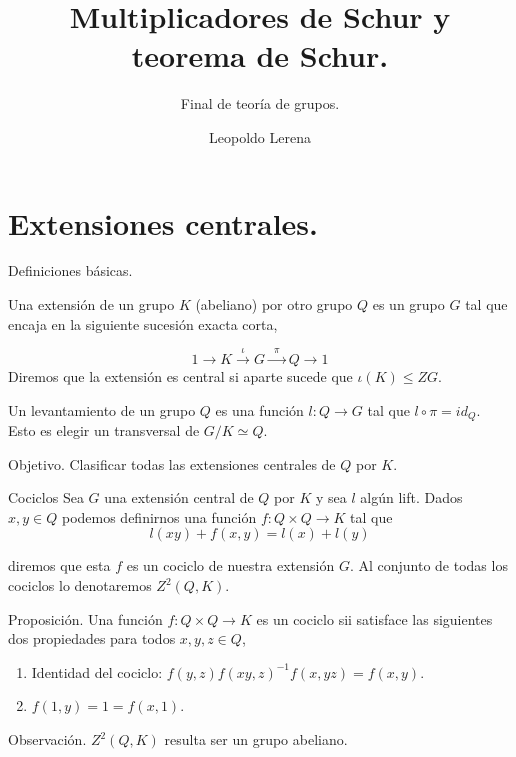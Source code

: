 \documentclass[aspectratio=169, 9pt]{beamer}
\title{Multiplicadores de Schur y teorema de Schur.}
\subtitle{Final de teoría de grupos.}
\date{}
\author{Leopoldo Lerena}
\institute{Universidad de Buenos Aires}
\begin{document}
\maketitle


\section[Extensiones centrales]{Extensiones centrales.}

\begin{frame}[fragile]{Definiciones básicas.}



\bigskip

Una \alert{extensión} de un grupo $K$ (abeliano) por otro grupo $Q$ es un grupo $G$ tal que encaja en la siguiente sucesión exacta corta,

\begin{equation*}
    1\longrightarrow K\xrightarrow{\phantom{a}\iota\phantom{a}}G\xrightarrow{\phantom{a}\pi\phantom{a}}Q\longrightarrow 1
\end{equation*}
\pause
Diremos que la extensión es \alert{central} si aparte sucede que $\iota(K) \le ZG$.

\medskip

Un \alert{levantamiento} de un grupo $Q$ es una función $l:Q \to G$ tal que $l \circ \pi = id_Q$. Esto es elegir un transversal de $G/K \simeq Q$.
\pause
\bigskip
\begin{alertblock}{Objetivo.}
Clasificar todas las extensiones centrales de $Q$ por $K$.
\end{alertblock}
\end{frame}

\begin{frame}[fragile]{Cociclos}
Sea $G$ una extensión central de $Q$ por $K$ y sea $l$ algún lift. Dados $x,y \in Q$ podemos definirnos una función $f:Q \times Q \to K$ tal que 
\begin{equation*}
l(xy) + f(x,y) = l(x) + l(y)    
\end{equation*} 

diremos que esta $f$ es un \alert{cociclo} de nuestra extensión $G$. Al conjunto de todas los cociclos lo denotaremos $Z^2(Q,K)$.
\medskip
\pause
{}
\begin{alertblock}{Proposición.}
	Una función $f:Q \times Q \to K$ es un cociclo sii satisface las siguientes dos propiedades para todos $x,y,z \in Q$,
	\begin{enumerate}
		\item \alert{Identidad del cociclo}: $f(y,z)f(xy,z)^{-1}f(x,yz) = f(x,y)$.
		\item $f(1,y)=1=f(x,1)$. 
	\end{enumerate}
\end{alertblock}
\pause
\begin{exampleblock}{Observación.}
 $Z^2(Q,K)$ resulta ser un grupo abeliano.
\end{exampleblock}
\end{frame}
\end{document}
